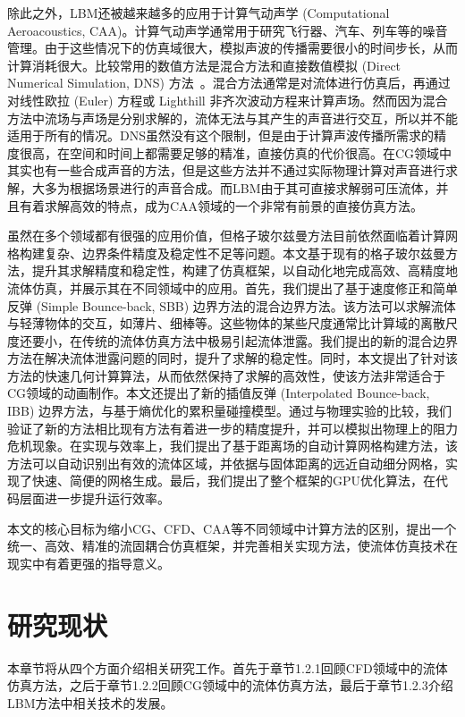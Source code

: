 除此之外，LBM还被越来越多的应用于计算气动声学 (Computational Aeroacoustics, CAA)。计算气动声学通常用于研究飞行器、汽车、列车等的噪音管理。由于这些情况下的仿真域很大，模拟声波的传播需要很小的时间步长，从而计算消耗很大。比较常用的数值方法是混合方法和直接数值模拟 (Direct Numerical Simulation, DNS) 方法~\cite{doi:10.2514/1.15993}。混合方法通常是对流体进行仿真后，再通过对线性欧拉 (Euler) 方程\cite{doi:10.1080/10618560410001673498,Bogey:2002:1610-1928:463,doi:10.2514/1.18933}或 Lighthill 非齐次波动方程\cite{doi:10.1098/rspa.1952.0060}来计算声场。然而因为混合方法中流场与声场是分别求解的，流体无法与其产生的声音进行交互，所以并不能适用于所有的情况。DNS虽然没有这个限制，但是由于计算声波传播所需求的精度很高，在空间和时间上都需要足够的精准，直接仿真的代价很高。在CG领域中其实也有一些合成声音的方法，但是这些方法并不通过实际物理计算对声音进行求解，大多为根据场景进行的声音合成。而LBM由于其可直接求解弱可压流体，并且有着求解高效的特点，成为CAA领域的一个非常有前景的直接仿真方法。

虽然在多个领域都有很强的应用价值，但格子玻尔兹曼方法目前依然面临着计算网格构建复杂、边界条件精度及稳定性不足等问题。本文基于现有的格子玻尔兹曼方法，提升其求解精度和稳定性，构建了仿真框架，以自动化地完成高效、高精度地流体仿真，并展示其在不同领域中的应用。首先，我们提出了基于速度修正和简单反弹 (Simple Bounce-back, SBB) 边界方法的混合边界方法。该方法可以求解流体与轻薄物体的交互，如薄片、细棒等。这些物体的某些尺度通常比计算域的离散尺度还要小，在传统的流体仿真方法中极易引起流体泄露。我们提出的新的混合边界方法在解决流体泄露问题的同时，提升了求解的稳定性。同时，本文提出了针对该方法的快速几何计算算法，从而依然保持了求解的高效性，使该方法非常适合于CG领域的动画制作。本文还提出了新的插值反弹 (Interpolated Bounce-back, IBB) 边界方法，与基于熵优化的累积量碰撞模型。通过与物理实验的比较，我们验证了新的方法相比现有方法有着进一步的精度提升，并可以模拟出物理上的阻力危机现象。在实现与效率上，我们提出了基于距离场的自动计算网格构建方法，该方法可以自动识别出有效的流体区域，并依据与固体距离的远近自动细分网格，实现了快速、简便的网格生成。最后，我们提出了整个框架的GPU优化算法，在代码层面进一步提升运行效率。

本文的核心目标为缩小CG、CFD、CAA等不同领域中计算方法的区别，提出一个统一、高效、精准的流固耦合仿真框架，并完善相关实现方法，使流体仿真技术在现实中有着更强的指导意义。


\section{研究现状}
本章节将从四个方面介绍相关研究工作。首先于章节1.2.1回顾CFD领域中的流体仿真方法，之后于章节1.2.2回顾CG领域中的流体仿真方法，最后于章节1.2.3介绍LBM方法中相关技术的发展。

